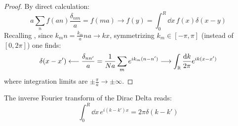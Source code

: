 \begin{proofbox}
  \begin{proof}
  By direct calculation:
  \begin{equation*}
    a \sum_{n} f(an) \frac{\delta_{nm}}{a} = f(ma) \longrightarrow f(y) = \int_0^R \dd x\, f(x) \delta(x - y)
  \end{equation*}
  Recalling , since $ k_m n = \frac{k_m}{a} na \rightarrow k x $, symmetrizing $ k_m \in [-\pi, \pi] $ (instead of $ [0, 2\pi] $) one finds:
  \begin{equation*}
    \delta(x - x') \longleftarrow \frac{\delta_{nn'}}{a} = \frac{1}{Na} \sum_{m} e^{ik_m (n - n')} \longrightarrow \int_{\mathbb{R}} \frac{\mathrm{d} k}{2\pi} e^{ik (x - x')}
  \end{equation*}
  where integration limits are $ \pm \frac{\pi}{a} \rightarrow \pm \infty $.
\end{proof}
\end{proofbox}

\begin{proposition}{}{}
  The inverse Fourier transform of the Dirac Delta reads:
  \begin{equation*}
    \int_0^R \dd x\, e^{i (k - k') x} = 2\pi \delta(k - k')
  \end{equation*}
\end{proposition}

